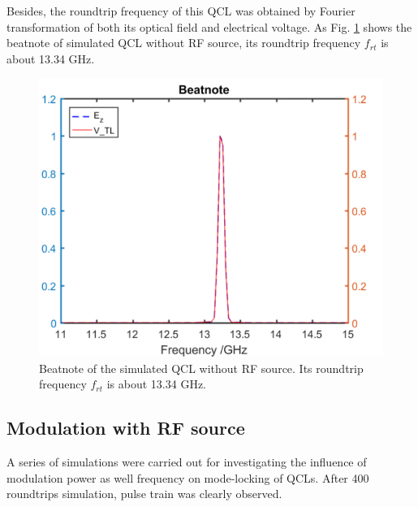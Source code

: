 \documentclass[11pt,final]{scrbook}
\begin{document}
Besides, the roundtrip frequency of this QCL was obtained by Fourier transformation of both its optical field and electrical voltage. As Fig. \ref{fig:beatnote_noRF} shows the beatnote of simulated QCL without RF source, its roundtrip frequency $f_{rt}$ is about 13.34 GHz.
\begin{figure}[htbp]
\begin{center}
\includegraphics[scale=0.8]{images/Beatnote_noRF.pdf}
\caption{Beatnote of the simulated QCL without RF source. Its roundtrip frequency $f_{rt}$ is about 13.34 GHz.}
\label{fig:beatnote_noRF}
\end{center}
\end{figure}

\subsection{Modulation with RF source} 
A series of simulations were carried out for investigating the influence of modulation power as well frequency on mode-locking of QCLs. After 400 roundtrips simulation, pulse train was clearly observed.
\end{document}
